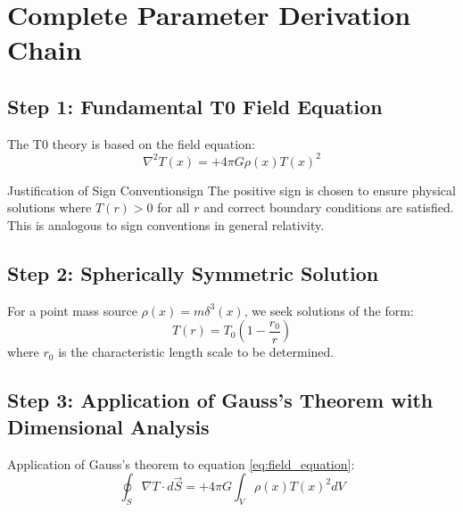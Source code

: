 \documentclass[12pt,a4paper]{article}
\begin{document}
	\section{Complete Parameter Derivation Chain}
	
	\subsection{Step 1: Fundamental T0 Field Equation}
	
	The T0 theory is based on the field equation:
	\begin{equation}
		\nabla^2 T(x) = +4\pi G \rho(x) T(x)^2
		\label{eq:field_equation}
	\end{equation}
	
	\begin{important}{Justification of Sign Convention}{sign}
		The positive sign is chosen to ensure physical solutions where $T(r) > 0$ for all $r$ and correct boundary conditions are satisfied. This is analogous to sign conventions in general relativity.
	\end{important}
	
	\subsection{Step 2: Spherically Symmetric Solution}
	
	For a point mass source $\rho(x) = m \delta^3(x)$, we seek solutions of the form:
	\begin{equation}
		T(r) = T_0 \left(1 - \frac{r_0}{r}\right)
		\label{eq:solution_form}
	\end{equation}
	where $r_0$ is the characteristic length scale to be determined.
	
	\subsection{Step 3: Application of Gauss's Theorem with Dimensional Analysis}
	
	Application of Gauss's theorem to equation \eqref{eq:field_equation}:
	\begin{equation}
		\oint_S \nabla T \cdot d\vec{S} = +4\pi G \int_V \rho(x) T(x)^2 dV
		\label{eq:gauss_law}
	\end{equation}
	
\end{document}
